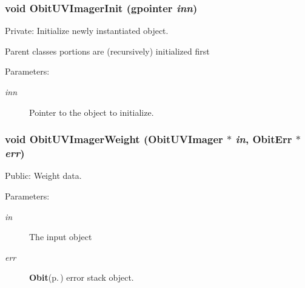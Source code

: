 \subsubsection{\setlength{\rightskip}{0pt plus 5cm}void Obit\-UVImager\-Init (gpointer {\em inn})}\label{ObitUVImager_8c_a3}


Private: Initialize newly instantiated object. 

Parent classes portions are (recursively) initialized first \begin{Desc}
\item[Parameters:]
\begin{description}
\item[{\em inn}]Pointer to the object to initialize. \end{description}
\end{Desc}
\subsubsection{\setlength{\rightskip}{0pt plus 5cm}void Obit\-UVImager\-Weight ({\bf Obit\-UVImager} $\ast$ {\em in}, {\bf Obit\-Err} $\ast$ {\em err})}\label{ObitUVImager_8c_a13}


Public: Weight data. 

\begin{Desc}
\item[Parameters:]
\begin{description}
\item[{\em in}]The input object \item[{\em err}]{\bf Obit}{\rm (p.\,\pageref{structObit})} error stack object. \end{description}
\end{Desc}
